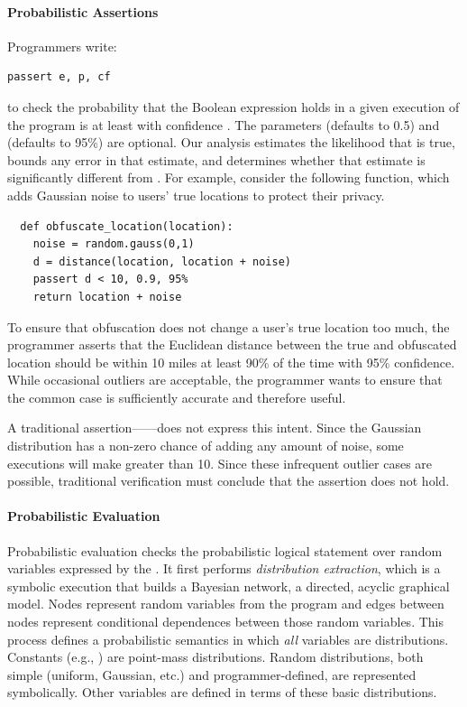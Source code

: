 \paragraph*{Probabilistic Assertions}
Programmers write:
%
\begin{lstlisting}
passert e, p, cf
\end{lstlisting}
%
to check the probability that the Boolean expression  holds in
a given execution of the program is at least  with confidence
. The parameters  (defaults to 0.5) and 
(defaults to 95\%) are optional. Our analysis estimates the likelihood
that  is true, bounds any error in that estimate, and determines
whether that
estimate is significantly different from
.
For example, consider the following function, which adds
Gaussian noise to users' true locations to protect their privacy.
%
\begin{lstlisting}
  def obfuscate_location(location):
    noise = random.gauss(0,1)
    d = distance(location, location + noise)
    passert d < 10, 0.9, 95%
    return location + noise
\end{lstlisting}
%
To ensure that obfuscation does not change a user's true location too
much, the programmer asserts that the Euclidean distance between the
true and obfuscated location should be within 10 miles at least 90\%
of the time with 95\% confidence. While occasional outliers are
acceptable, the programmer wants to ensure that the common case is
sufficiently accurate and therefore useful.

A traditional assertion------does not
express this intent.  Since the Gaussian distribution has a non-zero
chance of adding any amount of noise, some executions will make
 greater than 10.  Since these infrequent outlier cases are possible,
traditional verification must conclude that the assertion does not hold.

\paragraph*{Probabilistic Evaluation} Probabilistic evaluation
checks the probabilistic logical statement over random variables
expressed by the \passert. It first performs \emph{distribution extraction},
which is a symbolic execution that builds a Bayesian
network, a directed, acyclic graphical model. Nodes
represent random variables from the program and edges between nodes
represent conditional dependences between those random variables.
This process defines a probabilistic semantics in which \emph{all}
variables are distributions. Constants (e.g., ) are
point-mass distributions.  Random distributions, both simple (uniform,
Gaussian, etc.) and programmer-defined, are represented
symbolically.  Other variables are defined in terms of these basic
distributions.

